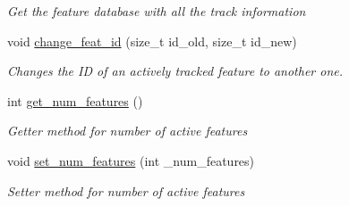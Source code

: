 \begin{DoxyCompactItemize}
$$\begin{DoxyCompactList}\small\item\em Get the feature database with all the track information \end{DoxyCompactList}\item 
void \hyperlink{classov__core_1_1TrackBase_a8f4f7f1c4de3c33a254c14b1f96af5a0}{change\+\_\+feat\+\_\+id} (size\+\_\+t id\+\_\+old, size\+\_\+t id\+\_\+new)
\begin{DoxyCompactList}\small\item\em Changes the ID of an actively tracked feature to another one. \end{DoxyCompactList}\item 
\mbox{\label{classov__core_1_1TrackBase_a35238206253104bd568d1321dd767610}} 
int \hyperlink{classov__core_1_1TrackBase_a35238206253104bd568d1321dd767610}{get\+\_\+num\+\_\+features} ()
\begin{DoxyCompactList}\small\item\em Getter method for number of active features \end{DoxyCompactList}\item 
\mbox{\label{classov__core_1_1TrackBase_a91d20228c100c753217043e7ebb5f99e}} 
void \hyperlink{classov__core_1_1TrackBase_a91d20228c100c753217043e7ebb5f99e}{set\+\_\+num\+\_\+features} (int \+\_\+num\+\_\+features)
\begin{DoxyCompactList}\small\item\em Setter method for number of active features \end{DoxyCompactList}\end{DoxyCompactItemize}
